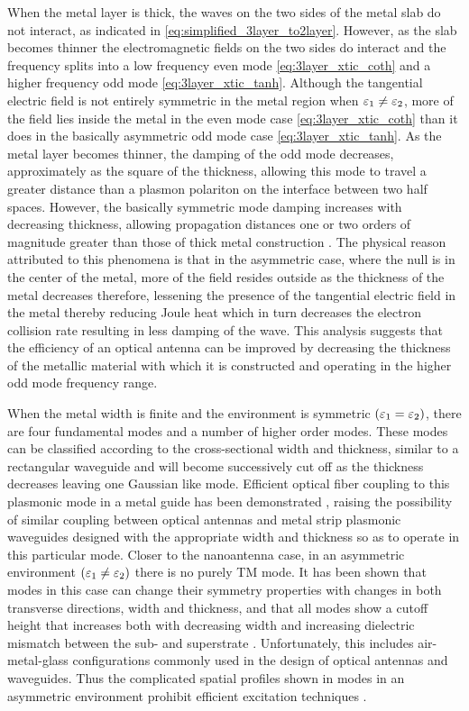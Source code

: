 \documentclass[11pt]{article}
\begin{document}
When the metal layer is thick, the waves on the two sides of the metal slab do not interact, as indicated in \eqref{eq:simplified_3layer_to2layer}. However, as the slab becomes thinner the electromagnetic fields on the two sides do interact and the frequency splits into a low frequency even mode \eqref{eq:3layer_xtic_coth} and a higher frequency odd mode \eqref{eq:3layer_xtic_tanh}. Although the tangential electric field is not entirely symmetric in the metal region when $\varepsilon_1 \ne \varepsilon_2$, more of the field lies inside the metal in the even mode case \eqref{eq:3layer_xtic_coth} than it does in the basically asymmetric odd mode case \eqref{eq:3layer_xtic_tanh}. As the metal layer becomes thinner, the damping of the odd mode decreases, approximately as the square of the thickness, allowing this mode to travel a greater distance than a plasmon polariton on the interface between two half spaces. However, the basically symmetric mode damping increases with decreasing thickness, allowing propagation distances one or two orders of magnitude greater than those of thick metal construction
\cite{Sarid1981}. The physical reason attributed to this phenomena is that in the asymmetric case, where the null is in the center of the metal, more of the field resides outside as the thickness of the metal decreases therefore, lessening the presence of the tangential electric field in the metal thereby reducing Joule heat which in turn decreases the electron collision rate resulting in less damping of the wave. This analysis suggests that the efficiency of an optical antenna can be improved by decreasing the thickness of the metallic material with which it is constructed and operating in the higher odd mode frequency range.

When the metal width is finite and the environment is symmetric $(\varepsilon_1 = \varepsilon_2)$, there are four fundamental modes and a number of higher order modes. These modes can be classified according to the cross-sectional width and thickness, similar to a rectangular waveguide and will become successively cut off as the thickness decreases leaving one Gaussian like mode. Efficient optical fiber coupling to this plasmonic mode in a metal guide has been demonstrated \cite{Berini2000}, raising the possibility of similar coupling between optical antennas and metal strip plasmonic waveguides designed with the appropriate width and thickness so as to operate in this particular mode. Closer to the nanoantenna case, in an asymmetric environment $(\varepsilon_1 \ne \varepsilon_2)$ there is no purely TM mode. It has been shown that modes in this case can change their symmetry properties with changes in both transverse directions, width and thickness, and that all modes show a cutoff height that increases both with decreasing width and increasing dielectric mismatch
between the sub- and superstrate \cite{Berini2000,Berini2001}. Unfortunately, this includes air-metal-glass configurations commonly used in the design of optical antennas and waveguides. Thus the complicated spatial profiles shown in modes in an asymmetric environment prohibit efficient excitation techniques \cite{Maier2005,Yang1991}.
\end{document}
